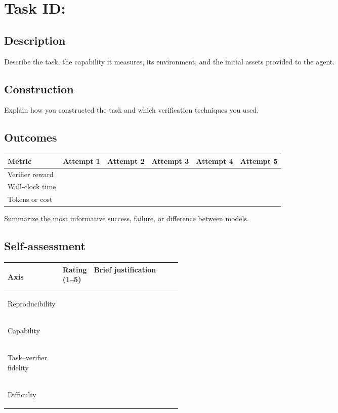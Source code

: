 \documentclass[11pt]{article}
\begin{document}
\section*{Task ID: \underline{\hspace{0.62\linewidth}}}

\subsection*{Description}
Describe the task, the capability it measures, its environment, and the initial assets provided to the agent.

\vspace{1.1in}

\subsection*{Construction}
Explain how you constructed the task and which verification techniques you used.

\vspace{1.1in}

\subsection*{Outcomes}

\begin{center}
\renewcommand{\arraystretch}{1.3}
\begin{tabularx}{\linewidth}{>{\raggedright\arraybackslash}Xccccc}
  \toprule
  Metric & Attempt 1 & Attempt 2 & Attempt 3 & Attempt 4 & Attempt 5 \\
  \midrule
  Verifier reward & & & & & \\
  Wall-clock time & & & & & \\
  Tokens or cost & & & & & \\
  \bottomrule
\end{tabularx}
\end{center}

Summarize the most informative success, failure, or difference between models.

\vspace{0.65in}

\subsection*{Self-assessment}

\begin{center}
\renewcommand{\arraystretch}{1.3}
\begin{tabularx}{\linewidth}{>{\bfseries\raggedright\arraybackslash}p{0.25\linewidth}p{0.15\linewidth}X}
  \toprule
  Axis & Rating (1--5) & Brief justification \\
  \midrule
  Reproducibility & & \\
  Capability & & \\
  Task--verifier fidelity & & \\
  Difficulty & & \\
  \bottomrule
\end{tabularx}
\end{center}
\end{document}
